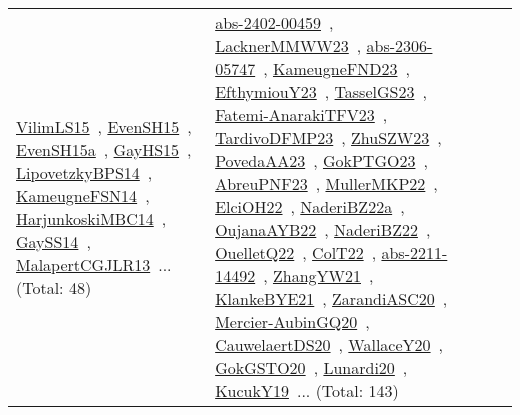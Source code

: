{\begin{longtable}{lp{3cm}>{\raggedright\arraybackslash}p{6cm}>{\raggedright\arraybackslash}p{6cm}>{\raggedright\arraybackslash}p{8cm}}
\href{../works/VilimLS15.pdf}{VilimLS15}~\cite{VilimLS15}, \href{../works/EvenSH15.pdf}{EvenSH15}~\cite{EvenSH15}, \href{../works/EvenSH15a.pdf}{EvenSH15a}~\cite{EvenSH15a}, \href{../works/GayHS15.pdf}{GayHS15}~\cite{GayHS15}, \href{../works/LipovetzkyBPS14.pdf}{LipovetzkyBPS14}~\cite{LipovetzkyBPS14}, \href{../works/KameugneFSN14.pdf}{KameugneFSN14}~\cite{KameugneFSN14}, \href{../works/HarjunkoskiMBC14.pdf}{HarjunkoskiMBC14}~\cite{HarjunkoskiMBC14}, \href{../works/GaySS14.pdf}{GaySS14}~\cite{GaySS14}, \href{../works/MalapertCGJLR13.pdf}{MalapertCGJLR13}~\cite{MalapertCGJLR13}... (Total: 48) & \href{../works/abs-2402-00459.pdf}{abs-2402-00459}~\cite{abs-2402-00459}, \href{../works/LacknerMMWW23.pdf}{LacknerMMWW23}~\cite{LacknerMMWW23}, \href{../works/abs-2306-05747.pdf}{abs-2306-05747}~\cite{abs-2306-05747}, \href{../works/KameugneFND23.pdf}{KameugneFND23}~\cite{KameugneFND23}, \href{../works/EfthymiouY23.pdf}{EfthymiouY23}~\cite{EfthymiouY23}, \href{../works/TasselGS23.pdf}{TasselGS23}~\cite{TasselGS23}, \href{../works/Fatemi-AnarakiTFV23.pdf}{Fatemi-AnarakiTFV23}~\cite{Fatemi-AnarakiTFV23}, \href{../works/TardivoDFMP23.pdf}{TardivoDFMP23}~\cite{TardivoDFMP23}, \href{../works/ZhuSZW23.pdf}{ZhuSZW23}~\cite{ZhuSZW23}, \href{../works/PovedaAA23.pdf}{PovedaAA23}~\cite{PovedaAA23}, \href{../works/GokPTGO23.pdf}{GokPTGO23}~\cite{GokPTGO23}, \href{../works/AbreuPNF23.pdf}{AbreuPNF23}~\cite{AbreuPNF23}, \href{../works/MullerMKP22.pdf}{MullerMKP22}~\cite{MullerMKP22}, \href{../works/ElciOH22.pdf}{ElciOH22}~\cite{ElciOH22}, \href{../works/NaderiBZ22a.pdf}{NaderiBZ22a}~\cite{NaderiBZ22a}, \href{../works/OujanaAYB22.pdf}{OujanaAYB22}~\cite{OujanaAYB22}, \href{../works/NaderiBZ22.pdf}{NaderiBZ22}~\cite{NaderiBZ22}, \href{../works/OuelletQ22.pdf}{OuelletQ22}~\cite{OuelletQ22}, \href{../works/ColT22.pdf}{ColT22}~\cite{ColT22}, \href{../works/abs-2211-14492.pdf}{abs-2211-14492}~\cite{abs-2211-14492}, \href{../works/ZhangYW21.pdf}{ZhangYW21}~\cite{ZhangYW21}, \href{../works/KlankeBYE21.pdf}{KlankeBYE21}~\cite{KlankeBYE21}, \href{../works/ZarandiASC20.pdf}{ZarandiASC20}~\cite{ZarandiASC20}, \href{../works/Mercier-AubinGQ20.pdf}{Mercier-AubinGQ20}~\cite{Mercier-AubinGQ20}, \href{../works/CauwelaertDS20.pdf}{CauwelaertDS20}~\cite{CauwelaertDS20}, \href{../works/WallaceY20.pdf}{WallaceY20}~\cite{WallaceY20}, \href{../works/GokGSTO20.pdf}{GokGSTO20}~\cite{GokGSTO20}, \href{../works/Lunardi20.pdf}{Lunardi20}~\cite{Lunardi20}, \href{../works/KucukY19.pdf}{KucukY19}~\cite{KucukY19}... (Total: 143)\\

\end{longtable}}
